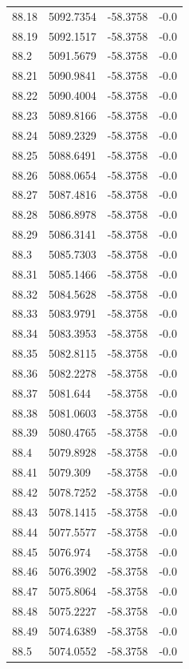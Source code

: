 \begin{table}[H]
\begin{tabular}{llll}
88.18 & 5092.7354 & -58.3758 & -0.0 \\
88.19 & 5092.1517 & -58.3758 & -0.0 \\
88.2 & 5091.5679 & -58.3758 & -0.0 \\
88.21 & 5090.9841 & -58.3758 & -0.0 \\
88.22 & 5090.4004 & -58.3758 & -0.0 \\
88.23 & 5089.8166 & -58.3758 & -0.0 \\
88.24 & 5089.2329 & -58.3758 & -0.0 \\
88.25 & 5088.6491 & -58.3758 & -0.0 \\
88.26 & 5088.0654 & -58.3758 & -0.0 \\
88.27 & 5087.4816 & -58.3758 & -0.0 \\
88.28 & 5086.8978 & -58.3758 & -0.0 \\
88.29 & 5086.3141 & -58.3758 & -0.0 \\
88.3 & 5085.7303 & -58.3758 & -0.0 \\
88.31 & 5085.1466 & -58.3758 & -0.0 \\
88.32 & 5084.5628 & -58.3758 & -0.0 \\
88.33 & 5083.9791 & -58.3758 & -0.0 \\
88.34 & 5083.3953 & -58.3758 & -0.0 \\
88.35 & 5082.8115 & -58.3758 & -0.0 \\
88.36 & 5082.2278 & -58.3758 & -0.0 \\
88.37 & 5081.644 & -58.3758 & -0.0 \\
88.38 & 5081.0603 & -58.3758 & -0.0 \\
88.39 & 5080.4765 & -58.3758 & -0.0 \\
88.4 & 5079.8928 & -58.3758 & -0.0 \\
88.41 & 5079.309 & -58.3758 & -0.0 \\
88.42 & 5078.7252 & -58.3758 & -0.0 \\
88.43 & 5078.1415 & -58.3758 & -0.0 \\
88.44 & 5077.5577 & -58.3758 & -0.0 \\
88.45 & 5076.974 & -58.3758 & -0.0 \\
88.46 & 5076.3902 & -58.3758 & -0.0 \\
88.47 & 5075.8064 & -58.3758 & -0.0 \\
88.48 & 5075.2227 & -58.3758 & -0.0 \\
88.49 & 5074.6389 & -58.3758 & -0.0 \\
88.5 & 5074.0552 & -58.3758 & -0.0 \\

\end{tabular}
\end{table}
